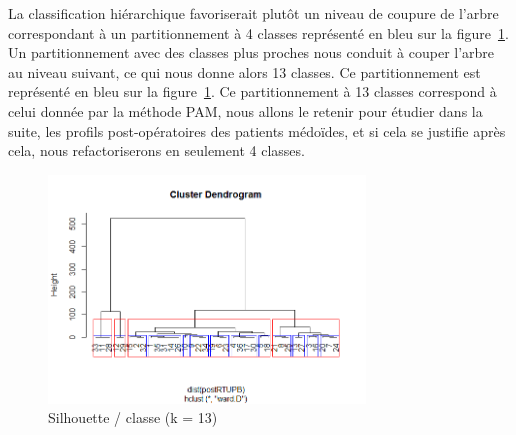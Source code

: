La classification hiérarchique favoriserait plutôt un niveau de coupure de l'arbre correspondant à un partitionnement à 4 classes représenté en bleu sur la figure~\ref{fig-rtupb-post-cah}.
Un partitionnement avec des classes plus proches nous conduit à couper l'arbre au niveau suivant, ce qui
nous donne alors 13 classes. Ce partitionnement est représenté en bleu sur la figure~\ref{fig-rtupb-post-cah}.
Ce partitionnement à 13 classes correspond à celui donnée par la méthode PAM, nous allons le retenir pour 
étudier dans la suite, les profils post-opératoires des patients médoïdes, et si cela se justifie après cela, nous refactoriserons en seulement 4 classes.

\begin{figure}[H]
\centering
\includegraphics[width=0.75\textwidth]{../Fig/RTUPB/rtupb-cah-k13-post.png}
\caption{Silhouette / classe (k = 13)}
\label{fig-rtupb-post-cah}
\end{figure}


%
